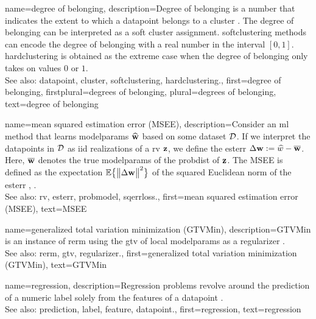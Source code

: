 {name={degree of belonging}, 
	description={Degree of belonging is a number that indicates the extent to which a \gls{datapoint} 
		belongs to a \gls{cluster} \cite[Ch. 8]{MLBasics}. The degree of belonging can be 
		interpreted as a soft \gls{cluster} assignment. \Gls{softclustering} methods can 
		encode the degree of belonging with a real number in the interval $[0,1]$. 
		\Gls{hardclustering} is obtained as the extreme case when the degree of belonging 
		only takes on values $0$ or $1$.
					\\ 
		See also: \gls{datapoint}, \gls{cluster}, \gls{softclustering}, \gls{hardclustering}.}, 
	first={degree of belonging},
	firstplural={degrees of belonging},
	plural={degrees of belonging},
	text={degree of belonging} 
}

{name={mean squared estimation error (MSEE)},
	description={Consider an \gls{ml} method that 
		learns \glspl{modelparam} $\widehat{{\bf w}}$ based on some \gls{dataset} $\mathcal{D}$. 
		If we interpret the \glspl{datapoint} in $\mathcal{D}$ as \gls{iid} \glspl{realization} of a \gls{rv} ${\bf z}$, 
		we define the \gls{esterr} $\Delta {\bf w} := \widehat{w} - \overline{{\bf w}}$. 
		Here, $\overline{{\bf w}}$ denotes the true \glspl{modelparam} of the \gls{probdist} 
		of ${\bf z}$. The MSEE is 
		defined as the \gls{expectation} $\mathbb{E} \big\{ \big\| \Delta {\bf w} \big\|^{2} \big\}$ of the 
		squared Euclidean \gls{norm} of the \gls{esterr} \cite{LC}, \cite{kay}.
					\\ 
		See also: \gls{rv}, \gls{esterr}, \gls{probmodel}, \gls{sqerrloss}.},
	first={mean squared estimation error (MSEE)},
	text={MSEE} 
}

{name={generalized total variation minimization (GTVMin)},
	description={GTVMin is an instance of \gls{rerm} 
		using the \gls{gtv} of local \glspl{modelparam} as a \gls{regularizer} \cite{ClusteredFLTVMinTSP}.
					\\ 
		See also: \gls{rerm}, \gls{gtv}, \gls{regularizer}.},
	first={generalized total variation minimization (GTVMin)},
	text={GTVMin} 
}

{name={regression},
	description={Regression problems revolve around the 
		\gls{prediction} of a numeric \gls{label} solely from the \glspl{feature} of a \gls{datapoint} \cite[Ch. 2]{MLBasics}.
					\\ 
		See also: \gls{prediction}, \gls{label}, \gls{feature}, \gls{datapoint}.},
	first={regression},
	text={regression} 
}

